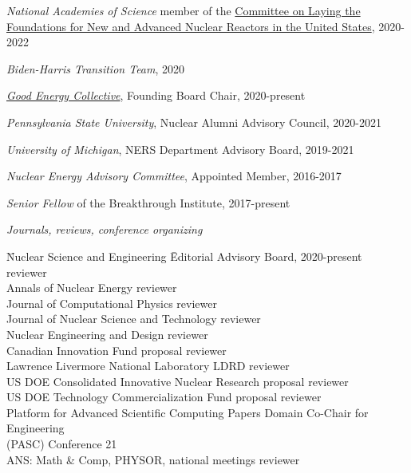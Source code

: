 \textit{National Academies of Science} member of the \href{https://www.nationalacademies.org/our-work/laying-the-foundation-for-new-and-advanced-nuclear-reactors-in-the-united-states#sectionCommittee}{Committee on Laying the
Foundations for New and Advanced Nuclear Reactors in the United States},
2020-2022

\textit{Biden-Harris Transition Team}, 2020

\textit{\href{https://www.goodenergycollective.org/}{Good Energy Collective}},
Founding Board Chair, 2020-present

\textit{Pennsylvania State University}, Nuclear Alumni Advisory Council, 2020-2021

\textit{University of Michigan}, NERS Department Advisory Board, 2019-2021


\textit{Nuclear Energy Advisory Committee}, Appointed Member, 2016-2017


\textit{Senior Fellow} of the Breakthrough Institute, 2017-present

\textit{Journals, reviews, conference organizing}
\begin{tabbing}
\hspace*{2 em}\= Nuclear Science and Engineering  \hspace*{8em} \= Editorial Advisory Board, 2020-present\\
 \>  \> reviewer\\
%
\> Annals of Nuclear Energy \> reviewer\\
%
\> Journal of Computational Physics \> reviewer\\
%
\> Journal of Nuclear Science and Technology \> reviewer\\
%
\> Nuclear Engineering and Design \> reviewer\\
%
\> Canadian Innovation Fund \> proposal reviewer\\
%
\> Lawrence Livermore  National Laboratory \> LDRD reviewer \\
%
\> US DOE Consolidated Innovative Nuclear Research \> proposal reviewer\\
%
\> US DOE Technology Commercialization Fund \> proposal reviewer\\
%
\> Platform for Advanced Scientific Computing  \> Papers Domain Co-Chair for Engineering\\
\>  \hspace*{2 em} (PASC) Conference 21\\
%
\> ANS: Math \& Comp, PHYSOR, national meetings \> reviewer
\end{tabbing}

